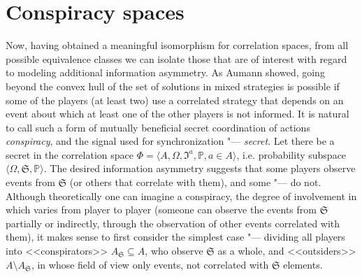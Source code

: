\section{Conspiracy spaces}\label{sec:ch1/sec3}

Now, having obtained a meaningful isomorphism for correlation spaces, from all possible equivalence classes we can isolate those that are of interest with regard to modeling additional information asymmetry. As Aumann showed, going beyond the convex hull of the set of solutions in mixed strategies is possible if some of the players (at least two) use a correlated strategy that depends on an event about which at least one of the other players is not informed. It is natural to call such a form of mutually beneficial secret coordination of actions \emph{conspiracy}, and the signal used for synchronization "--- \emph{secret}. Let there be a secret in the correlation space $\Phi = \langle A, \Omega, \mathfrak{I}^a, \mathbb{P}, a \in A \rangle$, i.e. probability subspace $\langle \Omega, \mathfrak{S}, \mathbb{P} \rangle$. The desired information asymmetry suggests that some players observe events from $\mathfrak{S}$ (or others that correlate with them), and some "--- do not. Although theoretically one can imagine a conspiracy, the degree of involvement in which varies from player to player (someone can observe the events from $\mathfrak{S}$ partially or indirectly, through the observation of other events correlated with them), it makes sense to first consider the simplest case "--- dividing all players into <<conspirators>> $ A_{\mathfrak{S}} \subseteq A$, who observe $\mathfrak{S}$ as a whole, and <<outsiders>> $A \setminus A_{\mathfrak{S}}$, in whose field of view only events, not correlated with $\mathfrak{S}$ elements. %

